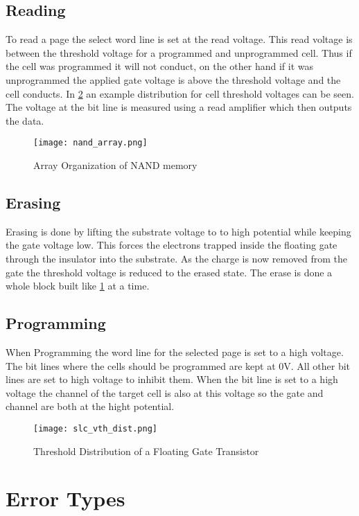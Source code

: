 \subsection{Reading}
To read a page the select word line is set at the read voltage. This read voltage is between the threshold voltage for a programmed and unprogrammed cell. Thus if the cell was programmed it will not conduct, on the other hand if it was unprogrammed the applied gate voltage is above the threshold voltage and the cell conducts. In \cref{nand_th} an example distribution for cell threshold voltages can be seen. The voltage at the bit line is measured using a read amplifier which then outputs the data. 

\begin{figure}
    \texttt{[image: nand\_array.png]}
    \centering
    \caption{Array Organization of NAND memory}
    \label{nand_array}
\end{figure}

\subsection{Erasing}
Erasing is done by lifting the substrate voltage to to high potential while keeping the gate voltage low. This forces the electrons trapped inside the floating gate through the insulator into the substrate. As the charge is now removed from the gate the threshold voltage is reduced to the erased state. The erase is done a whole block built like \cref{nand_array} at a time.

\subsection{Programming}
When Programming the word line for the selected page is set to a high voltage. The bit lines where the cells should be programmed are kept at 0V. All other bit lines are set to high voltage to inhibit them. When the bit line is set to a high voltage the channel of the target cell is also at this voltage so the gate and channel are both at the hight potential.

\begin{figure}
    \texttt{[image: slc\_vth\_dist.png]}
    \centering
    \caption{Threshold Distribution of a Floating Gate Transistor\cite{RiTo98}}
    \label{nand_th}
\end{figure}

\section{Error Types}


\cite{ZaTu16}